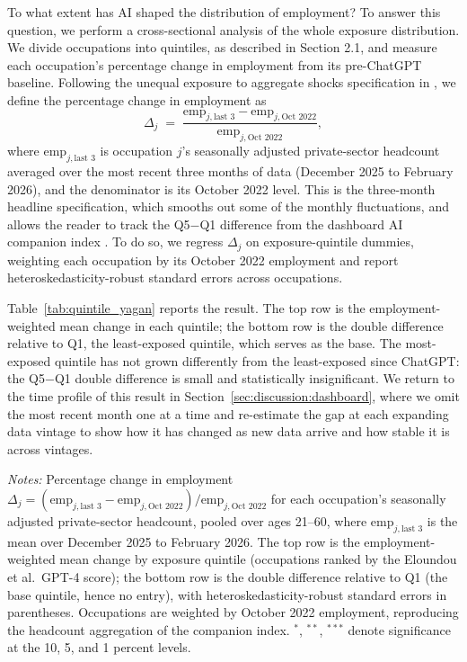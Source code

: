 \documentclass[12pt]{article}
\begin{document}
To what extent has AI shaped the distribution of employment? To answer this question, we perform a cross-sectional analysis of the whole exposure distribution. We divide occupations into quintiles, as described in Section 2.1, and measure each occupation's percentage change in employment from its pre-ChatGPT baseline. Following the unequal exposure to aggregate shocks specification in \cite{yagan2019}, we define the percentage change in employment as
\[
\Delta_j \;=\; \frac{\text{emp}_{j,\text{last 3}} - \text{emp}_{j,\text{Oct }2022}}{\text{emp}_{j,\text{Oct }2022}},
\]
where $\text{emp}_{j,\text{last 3}}$ is occupation $j$'s seasonally adjusted private-sector headcount averaged over the most recent three months of data (December 2025 to February 2026), and the denominator is its October 2022 level. This is the three-month headline specification, which smooths out some of the monthly fluctuations, and allows the reader to track the Q5$-$Q1 difference from the dashboard AI companion index \citep{kiindeksen2026}. To do so, we regress $\Delta_j$ on exposure-quintile dummies, weighting each occupation by its October 2022 employment and report heteroskedasticity-robust standard errors across occupations.

Table~\ref{tab:quintile_yagan} reports the result. The top row is the employment-weighted mean change in each quintile; the bottom row is the double difference relative to Q1, the least-exposed quintile, which serves as the base. The most-exposed quintile has not grown differently from the least-exposed since ChatGPT: the Q5$-$Q1 double difference is small and statistically insignificant. We return to the time profile of this result in Section~\ref{sec:discussion:dashboard}, where we omit the most recent month one at a time and re-estimate the gap at each expanding data vintage to show how it has changed as new data arrive and how stable it is across vintages.

\begin{table}[tp]
  \centering
  \caption{Employment change by AI-exposure quintile: all ages 21--60, private sector.}
  \label{tab:quintile_yagan}
  
  \begin{minipage}{\textwidth}\footnotesize\textit{Notes:} Percentage change in employment $\Delta_j = (\text{emp}_{j,\text{last 3}}-\text{emp}_{j,\text{Oct }2022})/\text{emp}_{j,\text{Oct }2022}$ for each occupation's seasonally adjusted private-sector headcount, pooled over ages 21--60, where $\text{emp}_{j,\text{last 3}}$ is the mean over December 2025 to February 2026. The top row is the employment-weighted mean change by exposure quintile (occupations ranked by the Eloundou et al.\ GPT-4 score); the bottom row is the double difference relative to Q1 (the base quintile, hence no entry), with heteroskedasticity-robust standard errors in parentheses. Occupations are weighted by October 2022 employment, reproducing the headcount aggregation of the companion index. $^{*}$, $^{**}$, $^{***}$ denote significance at the 10, 5, and 1 percent levels.\end{minipage}
\end{table}
\end{document}
